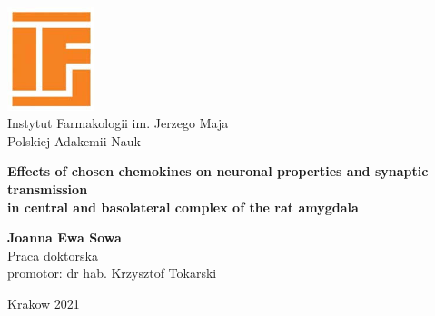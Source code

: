 
\begin{titlepage}
\thispagestyle{empty}\enlargethispage{\the\footskip}%
\begin{center}


\includegraphics[width=0.19\textwidth]{ifpan.jpg}\\[2pt]
{Instytut Farmakologii im. Jerzego Maja \\Polskiej Adakemii Nauk}\\[3pt]

\vspace{2.0cm}

 {\huge\bfseries Effects of chosen chemokines on neuronal properties and synaptic transmission  \\ in central and basolateral complex of the rat amygdala\\}

 \vspace{1.5cm}
 {\Large\bfseries Joanna Ewa Sowa}\\[5pt]

 \vspace{2cm}
{Praca doktorska} \\[5pt]

{promotor: dr hab. Krzysztof Tokarski} \\[5pt]


 \vfill



 \vfill
{Krakow 2021}


\thispagestyle{empty}



% 
% 





\end{center}
\end{titlepage}
